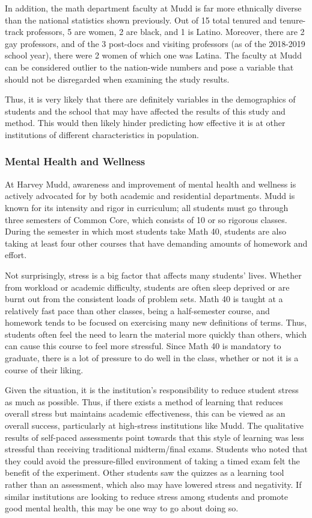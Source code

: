 In addition, the math department faculty at Mudd is far more ethnically diverse than the national statistics shown previously. Out of 15 total tenured and tenure-track professors, 5 are women, 2 are black, and 1 is Latino. Moreover, there are 2 gay professors, and of the 3 post-docs and visiting professors (as of the 2018-2019 school year), there were 2 women of which one was Latina. The faculty at Mudd can be considered outlier to the nation-wide numbers and pose a variable that should not be disregarded when examining the study results.

Thus, it is very likely that there are definitely variables in the demographics of students and the school that may have affected the results of this study and method. This would then likely hinder predicting how effective it is at other institutions of different characteristics in population.

\subsubsection{Mental Health and Wellness}
At Harvey Mudd, awareness and improvement of mental health and wellness is actively advocated for by both academic and residential departments. Mudd is known for its intensity and rigor in curriculum; all students must go through three semesters of Common Core, which consists of 10 or so rigorous classes. During the semester in which most students take Math 40, students are also taking at least four other courses that have demanding amounts of homework and effort.

Not surprisingly, stress is a big factor that affects many students' lives. Whether from workload or academic difficulty, students are often sleep deprived or are burnt out from the consistent loads of problem sets. Math 40 is taught at a relatively fast pace than other classes, being a half-semester course, and homework tends to be focused on exercising many new definitions of terms. Thus, students often feel the need to learn the material more quickly than others, which can cause this course to feel more stressful. Since Math 40 is mandatory to graduate, there is a lot of pressure to do well in the class, whether or not it is a course of their liking.

Given the situation, it is the institution's responsibility to reduce student stress as much as possible. Thus, if there exists a method of learning that reduces overall stress but maintains academic effectiveness, this can be viewed as an overall success, particularly at high-stress institutions like Mudd. The qualitative results of self-paced assessments point towards that this style of learning was less stressful than receiving traditional midterm/final exams. Students who noted that they could avoid the pressure-filled environment of taking a timed exam felt the benefit of the experiment. Other students saw the quizzes as a learning tool rather than an assessment, which also may have lowered stress and negativity. If similar institutions are looking to reduce stress among students and promote good mental health, this may be one way to go about doing so.

